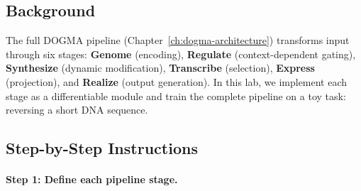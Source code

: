 \subsection{Background}

The full DOGMA pipeline (Chapter~\ref{ch:dogma-architecture}) transforms input through six stages: \textbf{Genome} (encoding), \textbf{Regulate} (context-dependent gating), \textbf{Synthesize} (dynamic modification), \textbf{Transcribe} (selection), \textbf{Express} (projection), and \textbf{Realize} (output generation). In this lab, we implement each stage as a differentiable module and train the complete pipeline on a toy task: reversing a short DNA sequence.

\subsection{Step-by-Step Instructions}

\paragraph{Step 1: Define each pipeline stage.}


